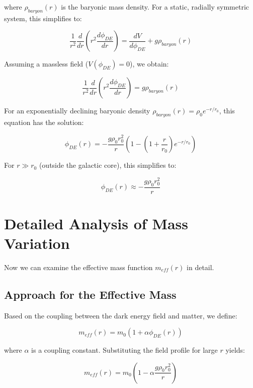 \documentclass[a4paper,12pt]{article}
\begin{document}
	where $\rho_{baryon}(r)$ is the baryonic mass density. For a static, radially symmetric system, this simplifies to:
	
	\begin{equation}
		\frac{1}{r^2}\frac{d}{dr}\left(r^2\frac{d\phi_{DE}}{dr}\right) = \frac{dV}{d\phi_{DE}} + g\rho_{baryon}(r)
	\end{equation}
	
	Assuming a massless field ($V(\phi_{DE}) = 0$), we obtain:
	
	\begin{equation}
		\frac{1}{r^2}\frac{d}{dr}\left(r^2\frac{d\phi_{DE}}{dr}\right) = g\rho_{baryon}(r)
	\end{equation}
	
	For an exponentially declining baryonic density $\rho_{baryon}(r) = \rho_0 e^{-r/r_0}$, this equation has the solution:
	
	\begin{equation}
		\phi_{DE}(r) = -\frac{g\rho_0 r_0^2}{r}(1 - (1 + \frac{r}{r_0})e^{-r/r_0})
	\end{equation}
	
	For $r \gg r_0$ (outside the galactic core), this simplifies to:
	
	\begin{equation}
		\phi_{DE}(r) \approx -\frac{g\rho_0 r_0^2}{r}
	\end{equation}
	
	\section{Detailed Analysis of Mass Variation}
	
	Now we can examine the effective mass function $m_{eff}(r)$ in detail.
	
	\subsection{Approach for the Effective Mass}
	
	Based on the coupling between the dark energy field and matter, we define:
	
	\begin{equation}
		m_{eff}(r) = m_0(1 + \alpha\phi_{DE}(r))
	\end{equation}
	
	where $\alpha$ is a coupling constant. Substituting the field profile for large $r$ yields:
	
	\begin{equation}
		m_{eff}(r) = m_0\left(1 - \alpha\frac{g\rho_0 r_0^2}{r}\right)
	\end{equation}
	
\end{document}
